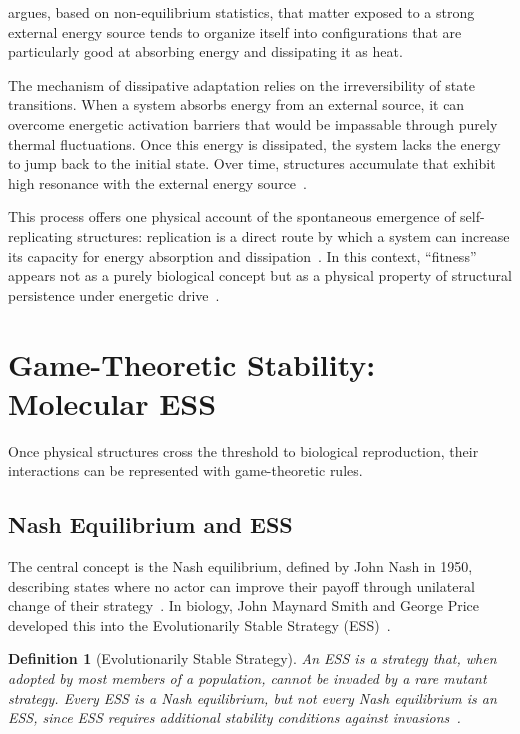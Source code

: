 \documentclass[12pt,a4paper]{article}
\newtheorem{definition}{Definition}
\theoremstyle{remark}
\begin{document}
\citet{England2013} argues, based on non-equilibrium statistics, that matter exposed to a strong external energy source tends to organize itself into configurations that are particularly good at absorbing energy and dissipating it as heat.

The mechanism of dissipative adaptation relies on the irreversibility of state transitions. When a system absorbs energy from an external source, it can overcome energetic activation barriers that would be impassable through purely thermal fluctuations. Once this energy is dissipated, the system lacks the energy to jump back to the initial state. Over time, structures accumulate that exhibit high resonance with the external energy source~\citep{EnglandNano}.

This process offers one physical account of the spontaneous emergence of self-replicating structures: replication is a direct route by which a system can increase its capacity for energy absorption and dissipation~\citep{EnglandNano}. In this context, ``fitness'' appears not as a purely biological concept but as a physical property of structural persistence under energetic drive~\citep{England2013}.

\section{Game-Theoretic Stability: Molecular ESS}
\label{sec:molecular}

Once physical structures cross the threshold to biological reproduction, their interactions can be represented with game-theoretic rules.

\subsection{Nash Equilibrium and ESS}

The central concept is the Nash equilibrium, defined by John Nash in 1950, describing states where no actor can improve their payoff through unilateral change of their strategy~\citep{NashPNAS,NashSFI}. In biology, John Maynard Smith and George Price developed this into the Evolutionarily Stable Strategy (ESS)~\citep{MaynardSmithPrice1973,MaynardSmith1982}.

\begin{definition}[Evolutionarily Stable Strategy]
An ESS is a strategy that, when adopted by most members of a population, cannot be invaded by a rare mutant strategy. Every ESS is a Nash equilibrium, but not every Nash equilibrium is an ESS, since ESS requires additional stability conditions against invasions~\citep{MaynardSmith1982}.
\end{definition}
\end{document}
